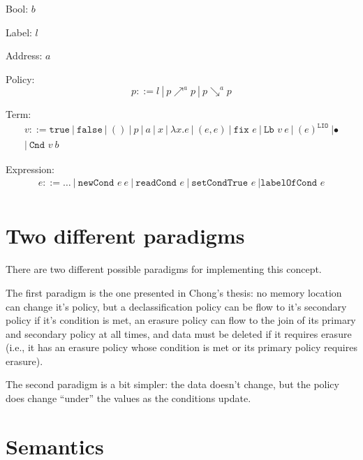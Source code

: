 \documentclass[11pt, oneside]{article}   	%
\begin{document}
Bool: $b$

Label: $l$

Address: $a$

Policy:
\begin{equation*} p ::=  l\ |\ p\nearrow^a p\ |\ p\searrow^a p  \end{equation*}

Term:
\begin{equation*}
\begin{split}
v::= \texttt{true}\ |\ \texttt{false}\ |\ ()\ |\ p\ |\ a\ |\ x\ |\  \lambda x.e\ |\ (e,e)\ 
|\ \texttt{fix } e\ |\ \texttt{Lb } v\ e\ |\ (e)^\texttt{LIO}\ | \bullet \\
|\ \texttt{Cnd } v\ b
\end{split}
\end{equation*}

Expression:
\begin{equation*}
\begin{split}
e::= \dots\ |\ \texttt{newCond } e\ e\ |\ \texttt{readCond } e\ |\ \texttt{setCondTrue } e\ | \texttt{labelOfCond } e \\
\end{split}
\end{equation*}

\section{Two different paradigms}
There are two different possible paradigms for implementing this concept.

The first paradigm is the one presented in Chong's thesis: no memory location can change it's policy, but a declassification policy can be flow to it's secondary policy if it's condition is met, an erasure policy can flow to the join of its primary and secondary policy at all times, and data must be deleted if it requires erasure (i.e., it has an erasure policy whose condition is met or its primary policy requires erasure).

The second paradigm is a bit simpler: the data doesn't change, but the policy does change ``under'' the values as the conditions update.


\section{Semantics}

\end{document}
